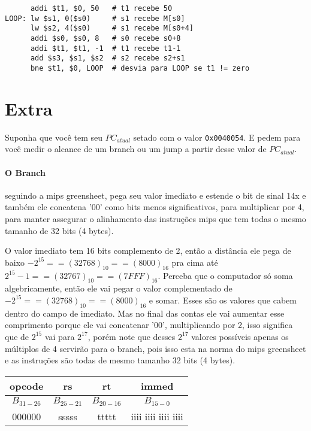 \documentclass{article}
\begin{document}
\begin{verbatim}
      addi $t1, $0, 50   # t1 recebe 50
LOOP: lw $s1, 0($s0)     # s1 recebe M[s0]
      lw $s2, 4($s0)     # s1 recebe M[s0+4]
      addi $s0, $s0, 8   # s0 recebe s0+8
      addi $t1, $t1, -1  # t1 recebe t1-1
      add $s3, $s1, $s2  # s2 recebe s2+s1
      bne $t1, $0, LOOP  # desvia para LOOP se t1 != zero
\end{verbatim}

\pagebreak
\section{Extra}

Suponha que você tem seu $PC_{atual}$ setado com o valor \verb|0x0040054|. E
pedem para você medir o alcance de um branch ou um jump a partir desse valor de
$PC_{atual}$.

\paragraph{O Branch} seguindo a mips greensheet, pega seu valor imediato e
estende o bit de sinal 14x e também ele concatena '00' como bits menos
significativos, para multiplicar por 4, para manter assegurar o alinhamento das
instruções mips que tem todas o mesmo tamanho de 32 bits (4 bytes).

O valor imediato tem 16 bits complemento de 2, então a distância ele pega de
baixo $-2^{15} == (32768)_{10} == (8000)_{16}$ pra cima até $2^{15} - 1 ==
(32767)_{10} == (7FFF)_{16}$. Perceba que o computador só soma algebricamente,
então ele vai pegar o valor complementado de $-2^{15} == (32768)_{10} ==
(8000)_{16}$ e somar. Esses são os valores que cabem dentro do campo de
imediato. Mas no final das contas ele vai aumentar esse comprimento porque ele
vai concatenar '00', multiplicando por 2, isso significa que de $2^{15}$ vai
para $2^{17}$, porém note que desses $2^{17}$ valores possíveis apenas os
múltiplos de 4 servirão para o branch, pois isso esta na norma do mips
greensheet e as instruções são todas de mesmo tamanho 32 bits (4 bytes).

\begin{table}[ht!]
\begin{tabular}{|c|c|c|c|}
\hline opcode & rs & rt & immed \\
\hline $B_{31-26}$ & $B_{25-21}$ & $B_{20-16}$ & $B_{15-0}$ \\
\hline 000000 & sssss & ttttt & iiii iiii iiii iiii \\
\hline
\end{tabular}
\end{table}
\end{document}

